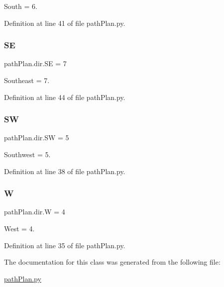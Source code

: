 South = 6. 



Definition at line 41 of file path\+Plan.\+py.

\mbox{\label{classpath_plan_1_1dir_a748bd4e686a7a6401bb9ed1a65962244}} 
\subsubsection{\texorpdfstring{SE}{SE}}
{\footnotesize\ttfamily path\+Plan.\+dir.\+SE = 7\hspace{0.3cm}{\ttfamily [static]}}



Southeast = 7. 



Definition at line 44 of file path\+Plan.\+py.

\mbox{\label{classpath_plan_1_1dir_a27d5dbc908c392e61e749c8090cbfb75}} 
\subsubsection{\texorpdfstring{SW}{SW}}
{\footnotesize\ttfamily path\+Plan.\+dir.\+SW = 5\hspace{0.3cm}{\ttfamily [static]}}



Southwest = 5. 



Definition at line 38 of file path\+Plan.\+py.

\mbox{\label{classpath_plan_1_1dir_a73cd667b05ff0a4836e3c07ce8f458ce}} 
\subsubsection{\texorpdfstring{W}{W}}
{\footnotesize\ttfamily path\+Plan.\+dir.\+W = 4\hspace{0.3cm}{\ttfamily [static]}}



West = 4. 



Definition at line 35 of file path\+Plan.\+py.



The documentation for this class was generated from the following file\+:\begin{DoxyCompactItemize}
\item 
\mbox{\hyperlink{path_plan_8py}{path\+Plan.\+py}}\end{DoxyCompactItemize}

